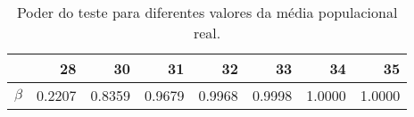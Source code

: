 \begin{table}[ht]
\centering
\caption{Poder do teste para diferentes valores da média populacional real.} 
\label{tb:1b}
\begin{tabular}{rrrrrrrr}
  \toprule
 & 28 & 30 & 31 & 32 & 33 & 34 & 35 \\ 
  \midrule
$\beta$ & 0.2207 & 0.8359 & 0.9679 & 0.9968 & 0.9998 & 1.0000 & 1.0000 \\ 
   \bottomrule
\end{tabular}
\end{table}
